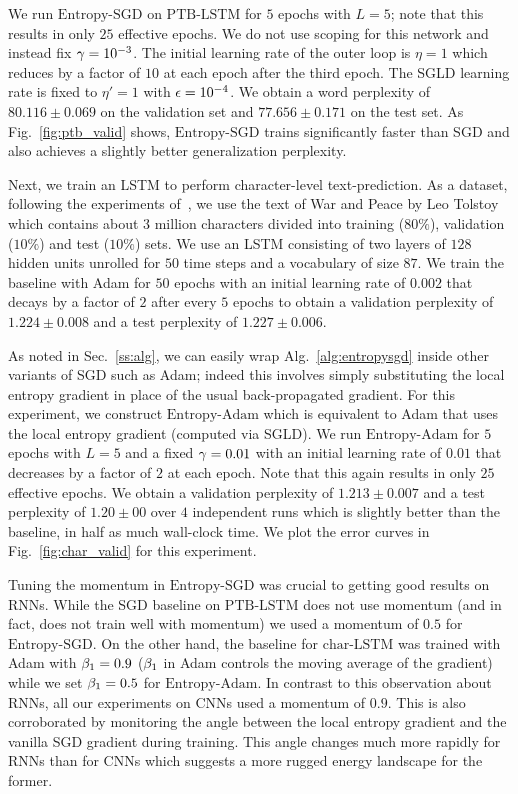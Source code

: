 \documentclass[10pt]{article}
\newcommand{\entropysgd}{\mathrm{Entropy}\textrm{-}\mathrm{SGD}}
\newcommand{\entropyadam}{\mathrm{Entropy}\textrm{-}\mathrm{Adam}}
\newcommand{\charlstm}{\textrm{char-LSTM}}
\newcommand{\ptblstm}{\textrm{PTB-LSTM}}
\newcommand{\pc}[2]{{\color{ForestGreen}#1}\marginpar{\tiny\noindent{\raggedright{\color{Sienna}[PC]}\color{Sienna}{#2} \par}}}
\begin{document}
We run $\entropysgd$ on $\ptblstm$ for $5$ epochs with $L = 5$; note that this results in only $25$ effective epochs. We do not use scoping for this network and instead fix $\gamma = 10^{-3}$. The initial learning rate of the outer loop is $\eta = 1$ which reduces by a factor of $10$ at each epoch after the third epoch. The SGLD learning rate is fixed to $\eta' = 1$ with $\epsilon = 10^{-4}$. We obtain a word perplexity of $80.116 \pm 0.069$ on the validation set and $77.656 \pm 0.171$ on the test set. As Fig.~\ref{fig:ptb_valid} shows, $\entropysgd$ trains significantly faster than SGD and also achieves a slightly better generalization perplexity.

Next, we train an LSTM to perform character-level text-prediction. As a dataset, following the experiments of~\citet{karpathy2015visualizing}, we use the text of War and Peace by Leo Tolstoy which contains about $3$ million characters divided into training ($80\%$), validation ($10\%$) and test ($10\%$) sets. We use an LSTM consisting of two layers of $128$ hidden units unrolled for $50$ time steps and a vocabulary of size $87$. We train the baseline with Adam for $50$ epochs with an initial learning rate of $0.002$ that decays by a factor of $2$ after every $5$ epochs to obtain a validation perplexity of $1.224 \pm 0.008$ and a test perplexity of \pc{$1.227 \pm 0.006$}{this is a place-holder}.

As noted in Sec.~\ref{ss:alg}, we can easily wrap Alg.~\ref{alg:entropysgd} inside other variants of SGD such as Adam; indeed this involves simply substituting the local entropy gradient in place of the usual back-propagated gradient. For this experiment, we construct $\entropyadam$ which is equivalent to Adam that uses the local entropy gradient (computed via SGLD). We run $\entropyadam$ for $5$ epochs with $L = 5$ and a fixed $\gamma = 0.01$ with an initial learning rate of $0.01$ that decreases by a factor of $2$ at each epoch. Note that this again results in only $25$ effective epochs. We obtain a validation perplexity of $1.213 \pm 0.007$ and a test perplexity of \pc{$1.20 \pm 00$}{this is a place-holder} over $4$ independent runs which is slightly better than the baseline, in half as much wall-clock time. We plot the error curves in Fig.~\ref{fig:char_valid} for this experiment.

Tuning the momentum in $\entropysgd$ was crucial to getting good results on RNNs. While the SGD baseline on $\ptblstm$ does not use momentum (and in fact, does not train well with momentum) we used a momentum of $0.5$ for $\entropysgd$. On the other hand, the baseline for $\charlstm$ was trained with Adam with $\beta_1 = 0.9$ ($\beta_1$ in Adam controls the moving average of the gradient) while we set $\beta_1 = 0.5$ for $\entropyadam$. In contrast to this observation about RNNs, all our experiments on CNNs used a momentum of $0.9$. \pc{This is also corroborated by monitoring the angle between the local entropy gradient and the vanilla SGD gradient during training. This angle changes much more rapidly for RNNs than for CNNs which suggests a more rugged energy landscape for the former.}{}
\end{document}
